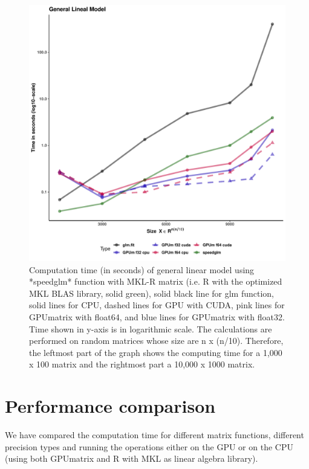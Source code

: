 \begin{figure}
\includegraphics[width=1\linewidth,height=0.5\textheight]{figures/plotGLMRes} \caption{Computation time (in seconds) of general linear model using *speedglm* function with MKL-R matrix (i.e. R with the optimized MKL BLAS library, solid green), solid black line for glm function, solid lines for CPU, dashed lines for GPU with CUDA, pink lines for GPUmatrix with float64, and blue lines for GPUmatrix with float32. Time shown in y-axis is in logarithmic scale. The calculations are performed on random matrices whose size are n x (n/10). Therefore, the leftmost part of the graph shows the computing time for a 1,000 x 100 matrix and the rightmost part a 10,000 x 1000 matrix.}\label{fig:GLMplot}
\end{figure}

\hypertarget{performance-comparison}{%
\section{Performance comparison}\label{performance-comparison}}

We have compared the computation time for different matrix functions, different precision types and running the operations either on the GPU or on the CPU (using both GPUmatrix and R with MKL as linear algebra library).

